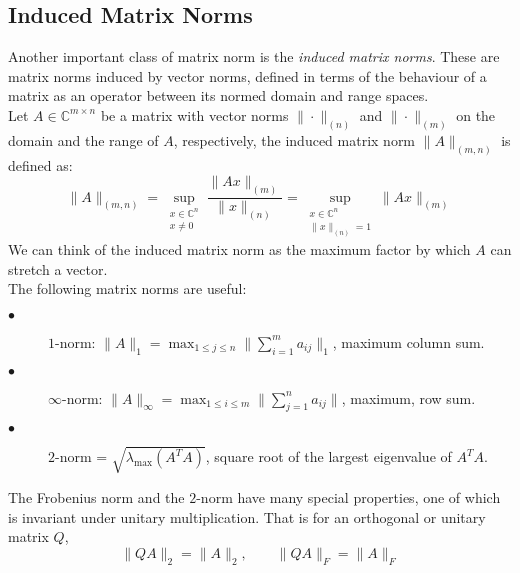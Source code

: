 \subsection{Induced Matrix Norms}
Another important class of matrix norm is the \textit{induced matrix norms}. These are matrix norms induced by vector norms, defined in terms of the behaviour of a matrix as an operator between its normed domain and range spaces.\\
Let $A \in \mathbb{C}^{m \times n}$ be a matrix with vector norms $\| \cdot \|_{(n)}$ and $\| \cdot \|_{(m)}$ on the domain and the range of $A$, respectively, the induced matrix norm $\| A \|_{(m, n)}$ is defined as:
\begin{equation}
	 \| A \|_{(m, n)} = \sup_{ \substack{x \in \mathbb{C}^n \\ x \neq 0}} \frac{\| Ax \|_{(m)}}{\| x \|_{(n)}} = \sup_{\substack{x \in \mathbb{C}^n \\\|x\|_{(n)} = 1}} \|Ax\|_{(m)}
\end{equation}
We can think of the induced matrix norm as the maximum factor by which $A$ can stretch a vector.\\
The following matrix norms are useful:
\begin{description}
	\item[$\bullet$] $1$-norm: $\|A\|_1 = \max_{1\leq j\leq n} \| \sum_{i=1}^{m} a_{ij}\|_1$, maximum column sum.
	\item[$\bullet$] $\infty$-norm: $\|A\|_\infty = \max_{1\leq i\leq m} \|\sum_{j=1}^{n} a_{ij}\|$, maximum, row sum.
	\item[$\bullet$] $2$-norm = $\sqrt{\lambda_{\max}(A^{T}A)}$, square root of the largest eigenvalue of $A^TA.$
\end{description}
The Frobenius norm and the $2$-norm have many special properties, one of which is invariant under unitary multiplication. That is for an orthogonal or unitary matrix $Q$,
\begin{equation}
	\|QA\|_2 = \|A\|_2, \qquad \|QA\|_F = \|A\|_F
\end{equation}

